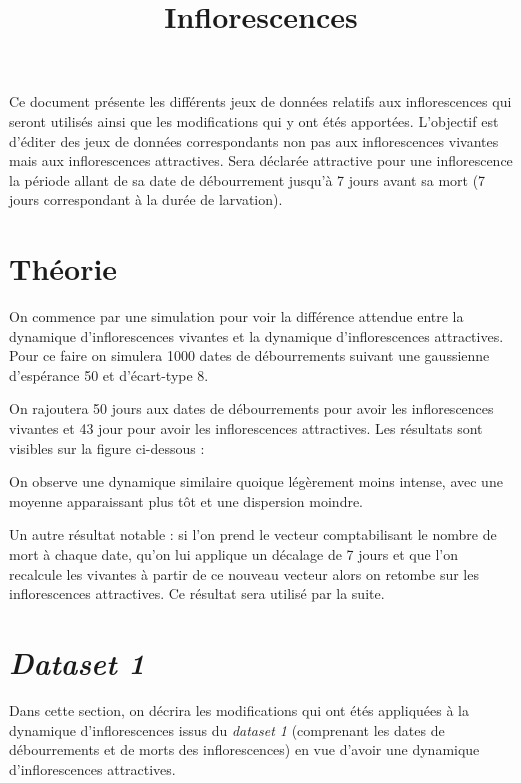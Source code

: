 \documentclass[a4paper, 11pt]{article}
\title{Inflorescences}
\author{}
\date{}
\begin{document}
\maketitle

Ce document présente les différents jeux de données relatifs aux inflorescences qui seront utilisés ainsi que les modifications qui y ont étés apportées.
L'objectif est d'éditer des jeux de données correspondants non pas aux inflorescences vivantes mais aux inflorescences attractives. Sera déclarée attractive pour une inflorescence la période allant de sa date de débourrement jusqu'à 7 jours avant sa mort (7 jours correspondant à la durée de larvation).

\section{Théorie}

On commence par une simulation pour voir la différence attendue entre la dynamique d'inflorescences vivantes et la dynamique d'inflorescences attractives. Pour ce faire on simulera 1000 dates de débourrements suivant une gaussienne d'espérance 50 et d'écart-type 8.

On rajoutera 50 jours aux dates de débourrements pour avoir les inflorescences vivantes et 43 jour pour avoir les inflorescences attractives. Les résultats sont visibles sur la figure ci-dessous : 

\begin{figure}[h]
 \centering
\end{figure}


On observe une dynamique similaire quoique légèrement moins intense, avec une moyenne apparaissant plus tôt et une dispersion moindre.

Un autre résultat notable : si l'on prend le vecteur comptabilisant le nombre de mort à chaque date, qu'on lui applique un décalage de 7 jours et que l'on recalcule les vivantes à partir de ce nouveau vecteur alors on retombe sur les inflorescences attractives.
Ce résultat sera utilisé par la suite.

\section{\textit{Dataset 1}}

Dans cette section, on décrira les modifications qui ont étés appliquées à la dynamique d'inflorescences issus du \textit{dataset 1} (comprenant les dates de débourrements et de morts des inflorescences) en vue d'avoir une dynamique d'inflorescences attractives.
\end{document}
